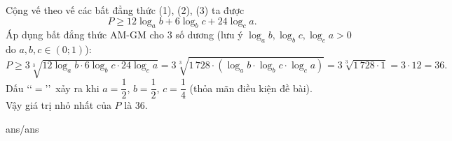 \begin{ex}
{		Cộng vế theo vế các bất đẳng thức (1), (2), (3) ta được
		\[P \ge 12\log_a b + 6\log_b c + 24\log_c a.\]
		Áp dụng bất đẳng thức AM-GM cho $3$ số dương (lưu ý $\log_a b, \log_b c, \log_c a > 0$ do $a,b,c \in (0;1)$):\\
		\[P \ge 3\sqrt[3]{12\log_a b \cdot 6\log_b c \cdot 24\log_c a} = 3\sqrt[3]{1\,728 \cdot (\log_a b \cdot \log_b c \cdot \log_c a)} = 3\sqrt[3]{1\,728 \cdot 1} = 3 \cdot 12 = 36.\]
		Dấu \lq\lq$=$\rq\rq\, xảy ra khi $a=\dfrac{1}{2}$, $b=\dfrac{1}{2}$, $c=\dfrac{1}{4}$ (thỏa mãn điều kiện đề bài).\\
		Vậy giá trị nhỏ nhất của $P$ là $36$.
	}
\end{ex}




\begin{indapan}
    {ans/ans\currfilebase}
\end{indapan}
